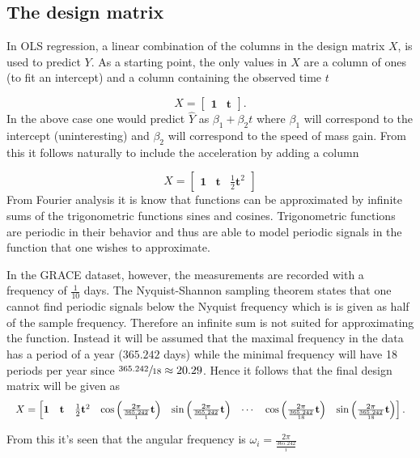 \subsection{The design matrix}
In OLS regression, a linear combination of the columns in the design matrix $X$, is used to predict $Y$.
As a starting point, the only values in $X$ are a column of ones (to fit an intercept) and a column containing the observed time $t$

\begin{equation}
X = \left[\begin{matrix} \mathbf{1} & \mathbf{t} \end{matrix}\right].
\end{equation}
In the above case one would predict $\hat{Y}$ as $\beta_1 + \beta_2 t$ where $\beta_1$ will correspond to the intercept (uninteresting) and $\beta_2$ will correspond to the speed of mass gain.
From this it follows naturally to include the acceleration by adding a column

\begin{equation}
X = \left[\begin{matrix} \mathbf{1} & \mathbf{t} & \frac{1}{2} \mathbf{t}^2 \end{matrix}\right]
\end{equation} 
From Fourier analysis it is know that functions can be approximated by infinite sums of the trigonometric functions sines and cosines.
Trigonometric functions are periodic in their behavior and thus are able to model periodic signals in the function that one wishes to approximate.

In the GRACE dataset, however, the measurements are recorded with a frequency of $\frac{1}{10}$ days.
The Nyquist-Shannon sampling theorem states that one cannot find periodic signals below the Nyquist frequency which is is given as half of the sample frequency. 
Therefore an infinite sum is not suited for approximating the function. 
Instead it will be assumed that the maximal frequency in the data has a period of a year ($365.242$ days) while the minimal frequency will have 18 periods per year since  $\sfrac{365.242}{18} \approx 20.29$. Hence it follows that the final design matrix will be given as
\begin{equation*}
\resizebox{\textwidth}{!}{$
X = \left[\begin{matrix}
	\mathbf{1} &
	\mathbf{t} &
	\frac{1}{2} \mathbf{t}^2 &
	\cos\left( \frac{2 \pi}{\frac{365.242}{1}} \mathbf{t} \right) &
	\sin\left( \frac{2 \pi}{\frac{365.242}{1}} \mathbf{t} \right) &
	\cdots &
	\cos\left( \frac{2 \pi}{\frac{365.242}{18}} \mathbf{t} \right) &
	\sin\left( \frac{2 \pi}{\frac{365.242}{18}} \mathbf{t} \right)
\end{matrix}\right].
$}
\end{equation*}

From this it's seen that the angular frequency is $\omega_i =  \frac{2 \pi}{\frac{365.242}{i}}$
